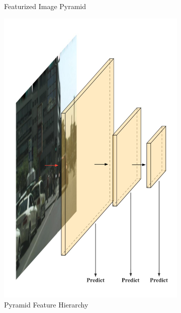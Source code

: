 \begin{figure}[htbp]
\begin{subfigure}[t]{0.3\linewidth}
        \caption{Featurized Image Pyramid}\label{FCNarch1}
    \end{subfigure}
    \begin{subfigure}[t]{0.3\linewidth}
        \includegraphics[width=1\textwidth]{figures/fcnarch2.png}
        \caption{Pyramid Feature Hierarchy}\label{FCNarch2}
    \end{subfigure}
    \begin{subfigure}[t]{0.3\linewidth}

\end{subfigure}
\end{figure}
